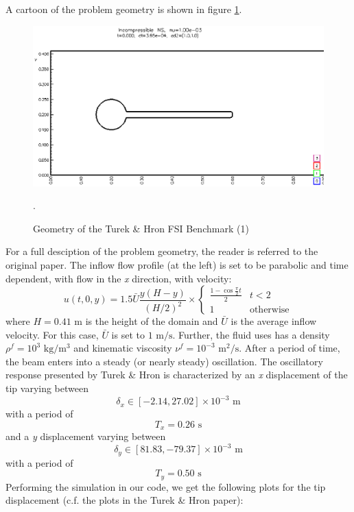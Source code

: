 \documentclass{article}
\begin{document}
\begin{enumerate}
A cartoon of the problem geometry is shown in figure \ref{fig:TurekHronGeometryFSI2}.
\begin{figure}[ht]
        \centering
        \includegraphics[width=\textwidth]{elastic_flag_geom} 
        \caption{Geometry of the Turek \& Hron FSI Benchmark (1)}
        \label{fig:TurekHronGeometryFSI2}.
\end{figure}
For a full desciption of the problem geometry, the reader is referred to the original paper. 
The inflow flow profile (at the left) is set to be parabolic and time dependent, with flow in the \emph{x} direction, with velocity:
\begin{equation}  u(t,0,y) = 1.5\bar{U}\frac{y(H-y)}{(H/2)^2}\times \left\{ \begin{array}{ll} \frac{1-\cos{\frac{\pi}{2}t}}{2} & t < 2 \\ 1 & \mbox{otherwise} \end{array} \right. \label{eq:eq11300} \end{equation}
where $H = 0.41 \mbox{ m}$ is the height of the domain and $\bar{U}$ is the average inflow velocity.  
For this case, $\bar{U}$ is set to $1 \mbox{ m/s}$. 
Further, the fluid uses has a density $\rho^f = 10^3 \mbox { kg/m$^3$}$ and kinematic viscosity $\nu^f = 10^{-3} \mbox { m$^2$/s}$.
After a period of time, the beam enters into a steady (or nearly steady) oscillation.  
The oscillatory response presented by Turek \& Hron is characterized by an \emph{x} displacement of the tip varying between
\[ \delta_x \in [-2.14,27.02] \times 10^{-3} \mbox{ m} \]
with a period of
\[ T_x = 0.26 \mbox{ s} \]
and a \emph{y} displacement varying between
\[ \delta_y \in [81.83,-79.37] \times 10^{-3} \mbox{ m} \]
with a period of
\[ T_y = 0.50 \mbox{ s} \]
Performing the simulation in our code, we get the following plots for the tip displacement (c.f. the plots in the Turek \& Hron paper):

\end{enumerate}
\end{document}
